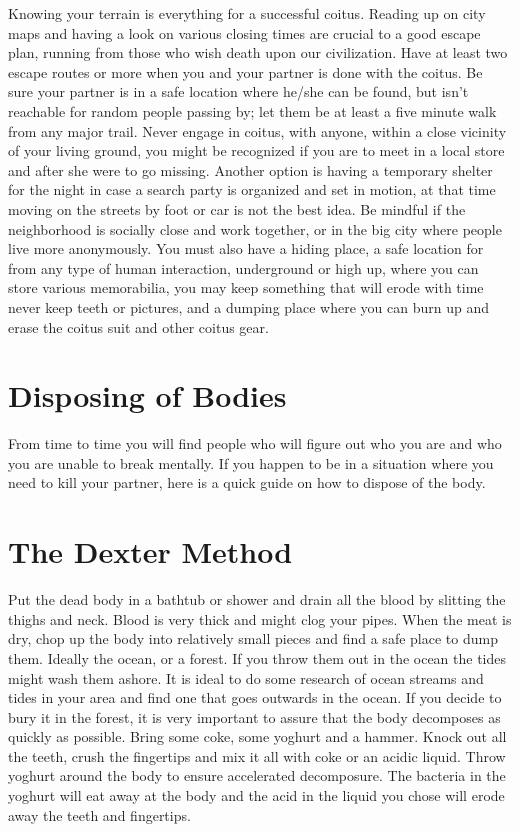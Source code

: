  
Knowing your terrain is everything for a successful coitus. Reading up on city 
maps and having a look on various closing times are crucial to a good escape 
plan, running from those who wish death upon our civilization. Have at least two 
escape routes or more when you and your partner is done with the coitus. Be sure 
your partner is in a safe location where he/she can be found, but isn't 
reachable for random people passing by; let them be at least a five minute walk 
from any major trail. Never engage in coitus, with anyone, within a close 
vicinity of your living ground, you might be recognized if you are to meet in a 
local store and after she were to go missing. Another option is having a 
temporary shelter for the night in case a search party is organized and set in 
motion, at that time moving on the streets by foot or car is not the best idea. 
Be mindful if the neighborhood is socially close and work together, or in the 
big city where people live more anonymously. You must also have a hiding place, 
a safe location for from any type of human interaction, underground or high up, 
where you can store various memorabilia, you may keep something that will erode 
with time never keep teeth or pictures, and a dumping place where you can burn 
up and erase the coitus suit and other coitus gear.


\section*{Disposing of Bodies}


From time to time you will find people who will figure out who you are and who 
you are unable to break mentally. If you happen to be in a situation where you 
need to kill your partner, here is a quick guide on how to dispose of the body.


\section*{The Dexter Method}

Put the dead body in a bathtub or shower and drain all the blood by slitting the 
thighs and neck. Blood is very thick and might clog your pipes. When the meat is 
dry, chop up the body into relatively small pieces and find a safe place to dump 
them. Ideally the ocean, or a forest. If you throw them out in the ocean the 
tides might wash them ashore. It is ideal to do some research of ocean streams 
and tides in your area and find one that goes outwards in the ocean. If you 
decide to bury it in the forest, it is very important to assure that the body 
decomposes as quickly as possible. Bring some coke, some yoghurt and a hammer. 
Knock out all the teeth, crush the fingertips and mix it all with coke or an 
acidic liquid. Throw yoghurt around the body to ensure accelerated decomposure. 
The bacteria in the yoghurt will eat away at the body and the acid in the liquid 
you chose will erode away the teeth and fingertips.


